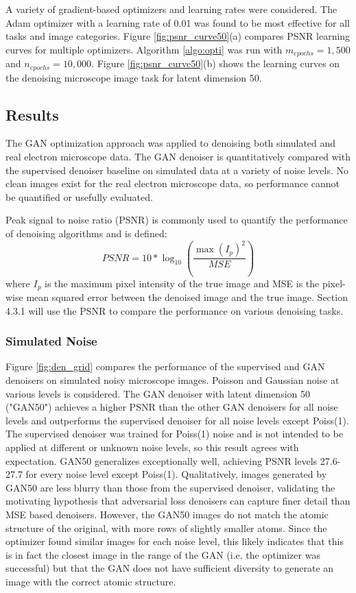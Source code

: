 \documentclass{article}
\begin{document}
A variety of gradient-based optimizers and learning rates were considered. The Adam \cite{adam} optimizer with a learning rate of 0.01 was found to be most effective for all tasks and image categories. Figure \ref{fig:psnr_curve50}(a) compares PSNR learning curves for multiple optimizers. Algorithm \ref{algo:opti} was run with $m_{epochs}=1,500$ and $n_{epochs}=10,000$. Figure \ref{fig:psnr_curve50}(b) shows the learning curves on the denoising microscope image task for latent dimension 50. 

\subsection{Results} 
The GAN optimization approach was applied to denoising both simulated and real electron microscope data. The GAN denoiser is quantitatively compared with the supervised denoiser baseline on simulated data at a variety of noise levels. No clean images exist for the real electron microscope data, so performance cannot be quantified or usefully evaluated.  

Peak signal to noise ratio (PSNR) is commonly used to quantify the performance of denoising algorithms and is defined:
\begin{equation}
    PSNR = 10*\log_{10}(\frac{\max(I_p)^2}{MSE})
\end{equation}
where $I_p$ is the maximum pixel intensity of the true image and MSE is the pixel-wise mean squared error between the denoised image and the true image. Section 4.3.1 will use the PSNR to compare the performance on various denoising tasks.

\subsubsection{Simulated Noise}

Figure \ref{fig:den_grid} compares the performance of the supervised and GAN denoisers on simulated noisy microscope images. Poisson and Gaussian noise at various levels is considered. The GAN denoiser with latent dimension 50 ("GAN50") achieves a higher PSNR than the other GAN denoisers for all noise levels and outperforms the supervised denoiser for all noise levels except Poiss(1). The supervised denoiser was trained for Poiss(1) noise and is not intended to be applied at different or unknown noise levels, so this result agrees with expectation. GAN50 generalizes exceptionally well, achieving PSNR levels 27.6-27.7 for every noise level except Poiss(1). Qualitatively, images generated by GAN50 are less blurry than those from the supervised denoiser, validating the motivating hypothesis that adversarial loss denoisers can capture finer detail than MSE based denoisers. However, the GAN50 images do not match the atomic structure of the original, with more rows of slightly smaller atoms. Since the optimizer found similar images for each noise level, this likely indicates that this is in fact the closest image in the range of the GAN (i.e. the optimizer was successful) but that the GAN does not have sufficient diversity to generate an image with the correct atomic structure. 
\end{document}
